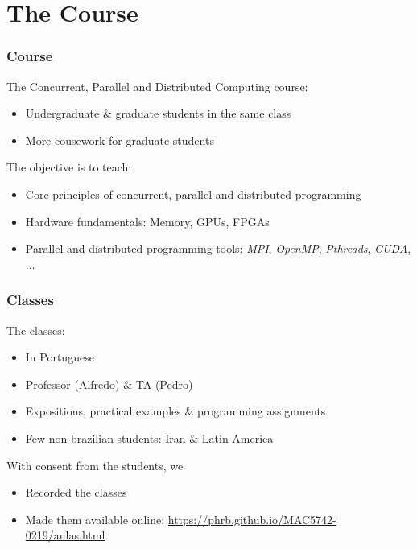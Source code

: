 \documentclass[10pt, compress, aspectratio=169]{beamer}
\begin{document}
\section{The Course}

\begin{frame}
    \frametitle{Course}
    The Concurrent, Parallel and Distributed Computing course:

    \begin{itemize}
        \item Undergraduate \& graduate students in the same class
        \item More cousework for graduate students
    \end{itemize}

    \pause

    The objective is to teach:

    \begin{itemize}
        \item Core principles of concurrent, parallel and distributed programming
        \item Hardware fundamentals: Memory, GPUs, FPGAs
        \item Parallel and distributed programming tools: \textit{MPI}, \textit{OpenMP}, \textit{Pthreads},
            \textit{CUDA}, $\dots$
    \end{itemize}
\end{frame}

\begin{frame}
    \frametitle{Classes}
    The classes:

    \begin{itemize}
        \item In Portuguese
        \item Professor (Alfredo) \& TA (Pedro)
        \item Expositions, practical examples \& programming assignments
        \item Few non-brazilian students: Iran \& Latin America
    \end{itemize}

    \pause

    With consent from the students, we

    \begin{itemize}
        \item Recorded the classes
        \item Made them available online:
            \url{https://phrb.github.io/MAC5742-0219/aulas.html}
    \end{itemize}
\end{frame}
\end{document}

